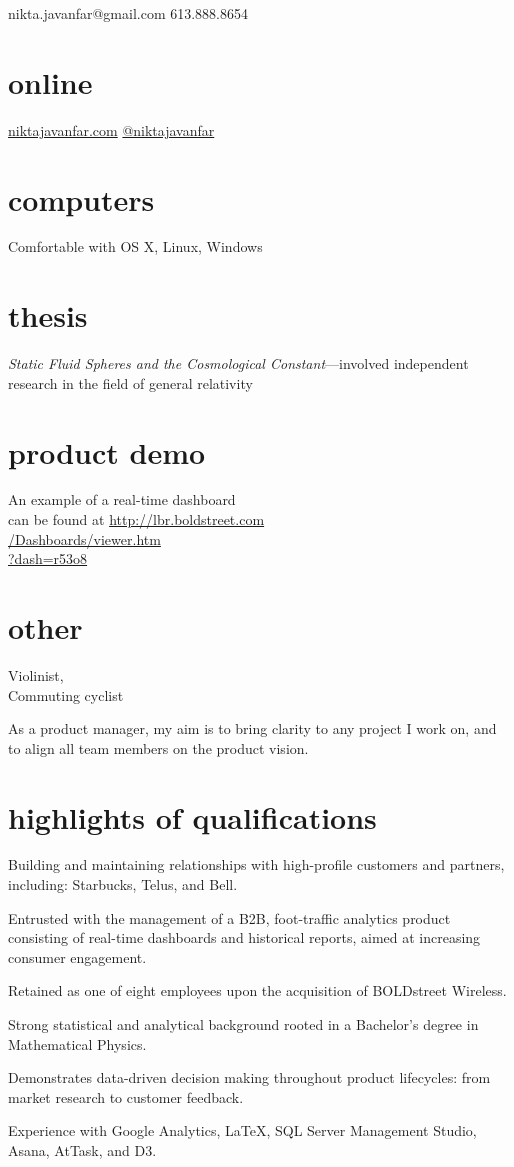 \documentclass{cv}
\begin{document}
	{nikta.javanfar@gmail.com 613.888.8654}
      
\begin{aside}
 \section{online}
 \href{http://niktajavanfar.com}{niktajavanfar.com}
 \href{http://twitter.com/niktajavanfar}{@niktajavanfar}
~
~
~
~
~
  \section{computers}
	Comfortable with OS X, Linux, Windows
~	
~
~
~
~
  \section{thesis}
	\emph{Static Fluid Spheres and the Cosmological Constant}---involved independent research in the field of general relativity
~
~
~
~
~
  \section{product demo}
 An example of a real-time dashboard \\ can be found at \href{http://lbr.boldstreet.com/Dashboards/viewer.htm?dash=r53o8}{http://lbr.boldstreet.com \\ /Dashboards/viewer.htm\\?dash=r53o8}
~	
~
~
~
~
   \section{other}
    	Violinist, \\Commuting cyclist
\end{aside}

As a product manager, my aim is to bring clarity to any project I work on, and to align all team members on the product vision.

\section{highlights of qualifications}
\begin{trivlist}
\item Building and maintaining relationships with high-profile customers and partners, including: Starbucks, Telus, and Bell.
\item Entrusted with the management of a B2B, foot-traffic analytics product consisting of real-time dashboards and historical reports, aimed at increasing consumer engagement.
\item Retained as one of eight employees upon the acquisition of BOLDstreet Wireless.
\item Strong statistical and analytical background rooted in a Bachelor's degree in Mathematical Physics. 
\item Demonstrates data-driven decision making throughout product lifecycles: from market research to customer feedback. 
\item Experience with Google Analytics, LaTeX, SQL Server Management Studio, Asana, AtTask, and D3.
\end{trivlist}
\end{document}
